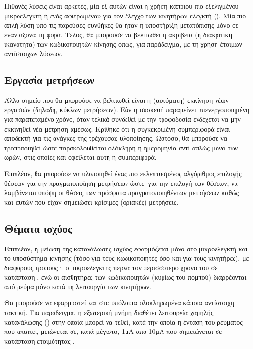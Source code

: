 Πιθανές λύσεις είναι αρκετές, μία εξ αυτών είναι η χρήση κάποιου πιο εξελιγμένου
μικροελεγκτή ή ενός αφιερωμένου για τον έλεγχο των κινητήρων ελεγκτή (). Μία πιο απλή λύση υπό τις παρούσες συνθήκες θα ήταν η υποστήριξη
μετατόπισης μόνο σε έναν άξονα τη φορά. Τέλος, θα μπορούσε να βελτιωθεί η
ακρίβεια (ή διακριτική ικανότητα) των κωδικοποιητών κίνησης όπως, για
παράδειγμα, με τη χρήση έτοιμων αντίστοιχων λύσεων.


\subsection*{Εργασία μετρήσεων}

Άλλο σημείο που θα μπορούσε να βελτιωθεί είναι η (αυτόματη) εκκίνηση νέων
εργασιών (δηλαδή, κύκλων μετρήσεων).
Εάν η συσκευή παραμείνει απενεργοποιημένη για παρατεταμένο χρόνο, όταν τελικά
συνδεθεί με την τροφοδοσία ενδέχεται να μην εκκινηθεί νέα μέτρηση αμέσως.
Κρίθηκε ότι η συγκεκριμένη συμπεριφορά είναι αποδεκτή για τις ανάγκες της
τρέχουσας υλοποίησης. Ωστόσο, θα μπορούσε να τροποποιηθεί ώστε παρακολουθείται
ολόκληρη η ημερομηνία αντί απλώς μόνο των ωρών, στις οποίες και οφείλεται αυτή
η συμπεριφορά.

Επιπλέον, θα μπορούσε να υλοποιηθεί ένας πιο εκλεπτυσμένος αλγόριθμος επιλογής
θέσεων για την πραγματοποίηση μετρήσεων ώστε, για την επιλογή των θέσεων, να
λαμβάνεται υπόψη οι θέσεις των πρόσφατα πραγματοποιηθέντων μετρήσεων καθώς
και αυτών που είχαν σημειώσει κρίσιμες (οριακές) μετρήσεις.


\subsection*{Θέματα ισχύος}

Επιπλέον, η μείωση της κατανάλωσης ισχύος εφαρμόζεται μόνο στο μικροελεγκτή και
το υποσύστημα κίνησης (τόσο για τους κωδικοποιητές όσο και για τους κινητήρες),
με διαφόρους τρόπους· ο μικροελεγκτής περνά τον περισσότερο χρόνο του σε
κατάσταση , ενώ οι αισθητήρες των κωδικοποιητών (κυρίως του
πομπού) διαρρέονται από ρεύμα μόνο κατά τη λειτουργία των κινητήρων.

Θα μπορούσε να εφαρμοστεί και στα υπόλοιπα ολοκληρωμένα κάποια αντίστοιχη
τακτική. Για παράδειγμα, η εξωτερική μνήμη  διαθέτει λειτουργία
χαμηλής κατανάλωσης () στην οποία μπορεί να τεθεί, κατά
την οποία η ένταση του ρεύματος που απαιτεί, μειώνεται σε, κατά μέγιστο, 1μA από
10μA που σημειώνεται σε κατάσταση ετοιμότητας \parencite[2,16]{25lc1024}.

